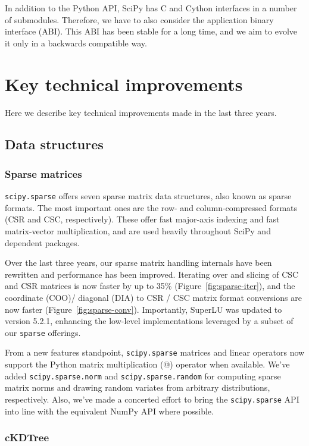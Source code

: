 \documentclass[fleqn,10pt]{wlscirep}
\begin{document}
In addition to the Python API, SciPy has C and Cython interfaces in a number
of submodules. Therefore, we have to also consider the application binary
interface (ABI). This ABI has been stable for a long time, and we aim to
evolve it only in a backwards compatible way.

\section*{Key technical improvements}
\label{sec:technical_improvements}
Here we describe key technical improvements made in the last three years.

\subsection*{Data structures}

\subsubsection*{Sparse matrices}

\texttt{scipy.sparse} offers seven sparse matrix data structures,
also known as sparse formats. The most important ones are the row- 
and column-compressed formats (CSR and CSC, respectively). 
These offer fast major-axis indexing and fast matrix-vector multiplication,
and are used heavily throughout SciPy and dependent packages.

Over the last three years, our sparse matrix handling internals have been
rewritten and performance has been improved. Iterating over and slicing of CSC
and CSR matrices is now faster by up to 35\% (Figure~\ref{fig:sparse-iter}),
 and the coordinate (COO)/ diagonal (DIA) to CSR / CSC matrix format
conversions are now faster (Figure~\ref{fig:sparse-conv}). Importantly,
SuperLU\cite{superlu_ug99} was updated to version 5.2.1, enhancing the
low-level implementations leveraged by a subset of our \texttt{sparse}
offerings.

From a new features standpoint, \texttt{scipy.sparse} matrices and linear
operators now support the Python matrix multiplication (@) operator when
available. We've added \texttt{scipy.sparse.norm} and
\texttt{scipy.sparse.random} for computing sparse matrix norms and drawing
random variates from arbitrary distributions, respectively. Also, we've made a
concerted effort to bring the \texttt{scipy.sparse} API into line with the
equivalent NumPy API where possible.

\subsubsection*{cKDTree}
\end{document}
